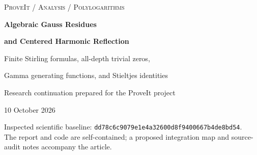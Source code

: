\documentclass[11pt]{article}
\numberwithin{equation}{section}
\theoremstyle{definition}\newtheorem{definition}[theorem]{Definition}
\theoremstyle{remark}\newtheorem{remark}[theorem]{Remark}
\newcommand{\e}{\mathrm e}
\newcommand{\sourcecommit}{\texttt{dd78c6c9079e1e4a32600d8f9400667b4de8bd54}}
\begin{document}
\begin{titlepage}
\vspace*{0.35in}
{\small\scshape ProveIt / Analysis / Polylogarithms\par}
\vspace{0.5in}
{\huge\bfseries Algebraic Gauss Residues\par}
\vspace{0.12in}
{\huge\bfseries and Centered Harmonic Reflection\par}
\vspace{0.35in}
{\Large Finite Stirling formulas, all-depth trivial zeros,\par
Gamma generating functions, and Stieltjes identities\par}
\vspace{0.5in}
{\large Research continuation prepared for the ProveIt project\par}
\vspace{0.15in}
{10 October 2026\par}
\vspace{0.55in}
\begin{abstract}
An explicit research question in the repository asks for a finite algebraic
proof of a Bernoulli-coefficient identity previously obtained from residues
of Gauss summation. We give such a proof, using integer-root interpolation
and a degree argument. We then evaluate the entire resonant coefficient
tail: its normalized exponential generating function is
$\e^{ct}{}_2F_1(a,b;r+1;1-\e^t)$, and every coefficient has a finite
Stirling-number formula. The coefficients form an Appell family in the
comparison shift.

A second development uses the moving reflection $a\mapsto1+u-a$ in the
complex-order Barnes--Hurwitz family. Its centered harmonic derivatives
have a common holomorphic zero at every nonpositive even integer. We prove
that the centering is uniquely forced by the corresponding all-depth
condition; for affine shifts, only the first two depths are needed.
An exact Gamma quotient evaluates an infinite family of convergent
harmonic sums at outer exponent two, with an explicit zeta-cumulant
formula at every depth. We also give shifted, all-order logarithmic
polygamma sums involving generalized Stieltjes constants and Hurwitz
zeta derivatives, ordinary antiderivatives, and an unequal-frequency
multivariate reflection theorem.

The existing fixed-shift Laurent theorem is acknowledged as prior work,
not relabeled as a new result. A version-specific Stieltjes indexing
error in a cited preprint is corrected. All-index claims are proved analytically
or algebraically. The accompanying 436 exact checks and 30 numerical
comparisons are separate regression evidence. Global priority is not
asserted, and neither S6 nor S8 is proved here.
\end{abstract}
\vfill
\noindent\small Inspected scientific baseline: \sourcecommit.\\
The report and code are self-contained; a proposed integration map and
source-audit notes accompany the article.
\end{titlepage}
\begingroup
\fontsize{9}{10.4}\selectfont
\tableofcontents
\endgroup
\clearpage
\end{document}
